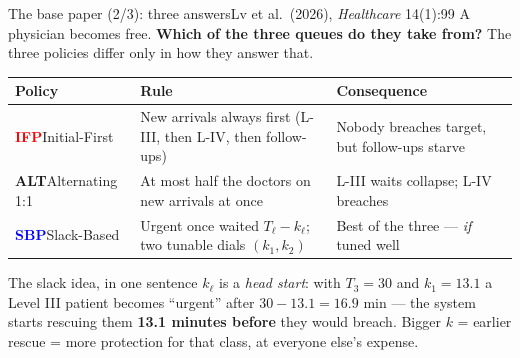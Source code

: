 \documentclass[aspectratio=169,11pt]{beamer}
\newcommand{\hl}[1]{\textcolor{deep}{\textbf{#1}}}
\begin{document}
\begin{frame}{The base paper \textnormal{(2/3)}: three answers}{Lv et al.\ (2026), \emph{Healthcare} 14(1):99}
\vspace{-0.2em}
{\small A physician becomes free. \hl{Which of the three queues do they take
from?} The three policies differ only in how they answer that.}
\vspace{0.4em}

\begin{center}\footnotesize
\begin{tabular}{@{}p{2.3cm}p{5.0cm}p{4.6cm}@{}}
\toprule
\textbf{Policy} & \textbf{Rule} & \textbf{Consequence} \\
\midrule
\textcolor{red}{\textbf{IFP}}\newline Initial-First
  & New arrivals always first (L-III, then L-IV, then follow-ups)
  & Nobody breaches target, but follow-ups starve \\[0.3em]
\textcolor{amber}{\textbf{ALT}}\newline Alternating 1:1
  & At most half the doctors on new arrivals at once
  & L-III waits collapse; L-IV breaches \\[0.3em]
\textcolor{blue}{\textbf{SBP}}\newline Slack-Based
  & Urgent once waited $T_\ell - k_\ell$; two tunable dials $(k_1,k_2)$
  & Best of the three --- \emph{if} tuned well \\
\bottomrule
\end{tabular}
\end{center}
\vspace{0.5em}

\begin{block}{The slack idea, in one sentence}
\footnotesize $k_\ell$ is a \emph{head start}: with $T_3=30$ and $k_1=13.1$ a
Level III patient becomes ``urgent'' after $30-13.1 = 16.9$ min --- the system
starts rescuing them \hl{13.1 minutes before} they would breach. Bigger $k$ =
earlier rescue = more protection for that class, at everyone else's expense.
\end{block}
\end{frame}
\end{document}
